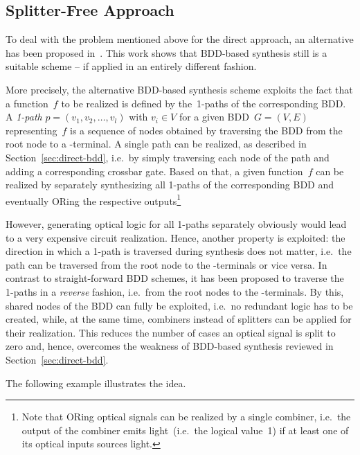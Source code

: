 \documentclass[10pt,letterpaper,twoside,openright]{book}
\begin{document}
\subsection{Splitter-Free Approach}\label{sec:rev-bdd}

To deal with the problem mentioned above for the direct approach, an alternative has been proposed in~\cite{WKHD:2015}. 
This work shows that BDD-based synthesis still is a suitable scheme -- if applied
in an entirely different fashion.

More precisely, the alternative BDD-based synthesis scheme exploits
the fact that a function~$f$ to be realized is defined by the~1-paths of the
corresponding BDD. A \emph{1-path}
$p=(v_1,v_2,\dots , v_l)$ with $v_i\in V$  
for a given BDD~$G=(V,E)$ representing~$f$ is a sequence of nodes obtained by traversing the
BDD from the root node to a -terminal. 
A single path can be realized, as described in Section~\ref{sec:direct-bdd},
i.e.~by simply traversing each node of the path and adding a corresponding crossbar gate.
Based on that, a given function~$f$ can be realized by separately
synthesizing all \mbox{1-paths} of the corresponding BDD and eventually ORing the respective 
outputs\footnote{Note that ORing optical signals can be realized
by a single combiner, i.e.~the output of the combiner emits light~(i.e.~the logical value~1)
if at least one of its optical inputs sources light.}

However, generating optical logic for all \mbox{1-paths} separately 
obviously would lead to a very expensive circuit
realization. Hence, another property is exploited: 
the direction in which a \mbox{1-path} is traversed during synthesis does not matter, 
i.e.~the path can be traversed from the root node to the 
\mbox{-terminals} or vice versa. 
In contrast to straight-forward BDD schemes, 
it has been proposed to traverse the \mbox{1-paths} in a
\emph{reverse} fashion, i.e.~from the root nodes to the \mbox{-terminals}. By this, shared nodes of the BDD can fully be exploited, i.e.~no redundant logic
has to be created, while, at the same time, combiners instead of splitters can be applied for
their realization. This reduces the number of cases an optical signal is split to zero and, hence,
overcomes the weakness of BDD-based synthesis reviewed in Section~\ref{sec:direct-bdd}.

The following example illustrates the idea.
\end{document}
